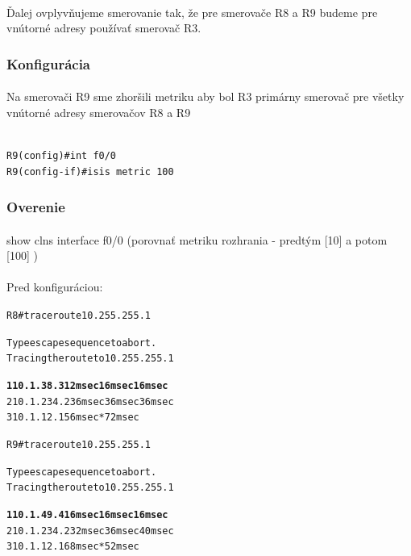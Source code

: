 \documentclass[12pt,twoside,a4paper]{report}
\begin{document}
\paragraph{}
Ďalej ovplyvňujeme smerovanie tak, že pre smerovače R8 a R9 budeme pre vnútorné adresy používať smerovač R3.


\subsubsection{Konfigurácia}
\paragraph{}
Na smerovači R9 sme zhoršili metriku aby bol R3 primárny smerovač pre všetky vnútorné adresy smerovačov R8 a R9

\noindent
{\selectfont
\begin{small}
\begin{verbatim}

R9(config)#int f0/0
R9(config-if)#isis metric 100
\end{verbatim}
\end{small}
}

\subsubsection{Overenie}
\paragraph{}
show clns interface f0/0 (porovnať metriku rozhrania - predtým [10] a potom [100] )


\paragraph{}
Pred konfiguráciou:

\noindent
{\selectfont
\begin{small}
\begin{alltt}
R8#traceroute 10.255.255.1

Type escape sequence to abort.
Tracing the route to 10.255.255.1

\textbf{  1 10.1.38.3 12 msec 16 msec 16 msec}
  2 10.1.234.2 36 msec 36 msec 36 msec
  3 10.1.12.1 56 msec *  72 msec



R9#traceroute 10.255.255.1

Type escape sequence to abort.
Tracing the route to 10.255.255.1

\textbf{  1 10.1.49.4 16 msec 16 msec 16 msec}
  2 10.1.234.2 32 msec 36 msec 40 msec
  3 10.1.12.1 68 msec *  52 msec

\end{alltt}
\end{small}
}
\end{document}
